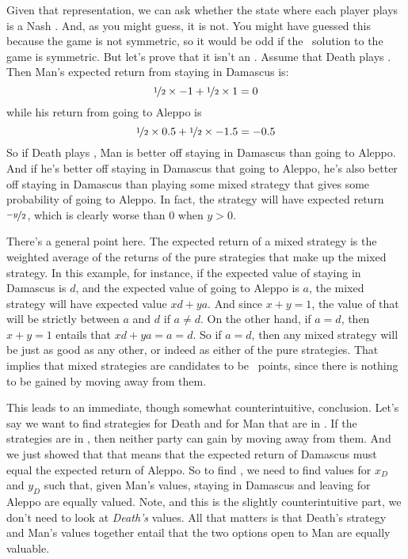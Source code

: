 Given that representation, we can ask whether the state where each player plays  is a Nash \eqm. And, as you might guess, it is not. You might have guessed this because the game is not symmetric, so it would be odd if the \eqm\ solution to the game is symmetric. But let's prove that it isn't an \eqm. Assume that Death plays . Then Man's expected return from staying in Damascus is:
\begin{equation*}
\nicefrac{1}{2} \times -1 + \nicefrac{1}{2} \times 1 = 0
\end{equation*}
\noindent while his return from going to Aleppo is 
\begin{equation*}
\nicefrac{1}{2} \times 0.5 + \nicefrac{1}{2} \times -1.5 = -0.5
\end{equation*}
\noindent So if Death plays , Man is better off staying in Damascus than going to Aleppo. And if he's better off staying in Damascus that going to Aleppo, he's also better off staying in Damascus than playing some mixed strategy that gives some probability of going to Aleppo. In fact, the strategy  will have expected return $\nicefrac{-y}{2}$, which is clearly worse than 0 when $y > 0$.

There's a general point here. The expected return of a mixed strategy is the weighted average of the returns of the pure strategies that make up the mixed strategy. In this example, for instance, if the expected value of staying in Damascus is $d$, and the expected value of going to Aleppo is $a$, the mixed strategy  will have expected value $xd + ya$. And since $x + y = 1$, the value of that will be strictly between $a$ and $d$ if $a \neq d$. On the other hand, if $a = d$, then $x + y = 1$ entails that $xd + ya = a = d$. So if $a = d$, then any mixed strategy will be just as good as any other, or indeed as either of the pure strategies. That implies that mixed strategies are candidates to be \eqm\ points, since there is nothing to be gained by moving away from them.

This leads to an immediate, though somewhat counterintuitive, conclusion. Let's say we want to find strategies  for Death and  for Man that are in \eqm. If the strategies are in \eqm, then neither party can gain by moving away from them. And we just showed that that means that the expected return of Damascus must equal the expected return of Aleppo. So to find , we need to find values for $x_D$ and $y_D$ such that, given Man's values, staying in Damascus and leaving for Aleppo are equally valued. Note, and this is the slightly counterintuitive part, we don't need to look at \textit{Death's} values. All that matters is that Death's strategy and Man's values together entail that the two options open to Man are equally valuable.


